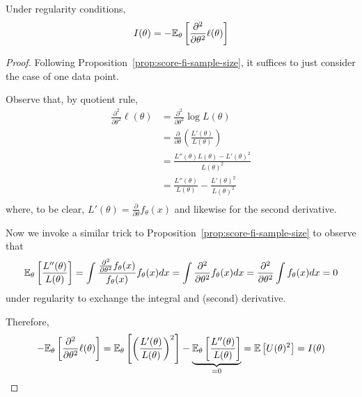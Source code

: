 \documentclass[../../../main.tex]{subfiles}
\begin{document}
\begin{proposition}
    Under regularity conditions,
    \begin{equation*}
        I(\theta)=-\mathbb{E}_\theta\left[\frac{\partial^2}{\partial \theta^2} \ell (\theta)\right]
    \end{equation*}
    \begin{proof}
        Following Proposition~\ref{prop:score-fi-sample-size}, it suffices to just consider the case of one data point.

        Observe that, by quotient rule,
        \begin{align*}
            \frac{\partial^2}{\partial \theta^2} \ell (\theta)&=\frac{\partial^2}{\partial \theta^2} \log L(\theta)\\
            &=\frac{\partial}{\partial \theta} \left(\frac{L'(\theta)}{L(\theta)}\right)\\
            &=\frac{L''(\theta)L(\theta)-L'(\theta)^2}{L(\theta)^2}\\
            &=\frac{L''(\theta)}{L(\theta)}-\frac{L'(\theta)^2}{L(\theta)^2}\\
        \end{align*}
        where, to be clear, $L'(\theta)=\frac{\partial}{\partial \theta}f_\theta(x)$ and likewise for the second derivative.
        
        Now we invoke a similar trick to Proposition~\ref{prop:score-fi-sample-size} to observe that
        \begin{equation*}
            \mathbb{E}_\theta\left[\frac{L''(\theta)}{L(\theta)}\right]=\int \frac{\frac{\partial^2}{\partial \theta^2}f_\theta(x)}{f_\theta(x)} f_\theta(x)dx=\int \frac{\partial^2}{\partial \theta^2} f_\theta(x)dx = \frac{\partial^2}{\partial \theta^2} \int f_\theta(x)dx=0
        \end{equation*}
        under regularity to exchange the integral and (second) derivative.

        Therefore,
        \begin{equation*}
            -\mathbb{E}_\theta\left[\frac{\partial^2}{\partial \theta^2} \ell (\theta)\right]=\mathbb{E}_\theta\left[\left(\frac{L'(\theta)}{L(\theta)}\right)^2\right]-\underbrace{\mathbb{E}_\theta\left[\frac{L''(\theta)}{L(\theta)}\right]}_{=0}=\mathbb{E}\left[U(\theta)^2\right]=I(\theta)
        \end{equation*}
    \end{proof}
\end{proposition}
\end{document}
